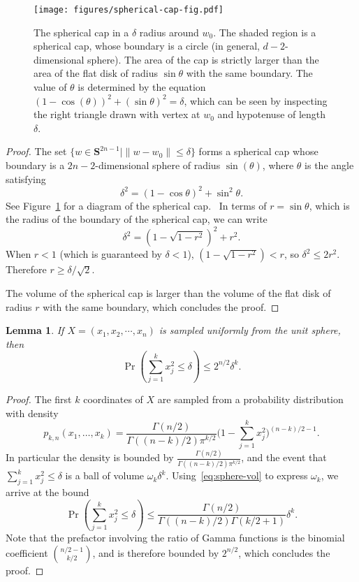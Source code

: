 \documentclass[11pt]{article}
\theoremstyle{plain}
\theoremstyle{plain}
\newtheorem{lem}{Lemma}
\theoremstyle{plain}
\theoremstyle{plain}
\theoremstyle{plain}
\theoremstyle{plain}
\theoremstyle{plain}
\theoremstyle{remark}
\theoremstyle{remark}
\theoremstyle{plain}
\theoremstyle{plain}
\theoremstyle{plain}
\theoremstyle{plain}
\newcommand{\Prob}{\Pr}
\newcommand{\Sphere}{{\mathbf S}}
\begin{document}
\begin{figure}
\centering
\texttt{[image: figures/spherical-cap-fig.pdf]} 
\caption{The spherical cap in a $\delta$ radius around $w_0$.  The shaded region is a spherical cap, whose boundary is a circle (in general, $d-2$-dimensional sphere).  The area of the cap is strictly larger than the area of the flat disk of radius $\sin\theta$ with the same boundary.  The value of $\theta$ is determined by the equation
$(1-\cos(\theta))^2 + (\sin\theta)^2 = \delta$, which can be seen by inspecting the right triangle drawn with vertex at $w_0$ and hypotenuse of length $\delta$.}
\label{fig:sphere-fig}
\end{figure}

\begin{proof}
The set $\{w\in\Sphere^{2n-1} \mid \|w-w_0\|\leq\delta\}$ forms a spherical cap whose boundary is a
$2n-2$-dimensional sphere of radius $\sin(\theta)$, where $\theta$ is the angle satisfying
\[
\delta^2 = (1-\cos\theta)^2 + \sin^2\theta.
\]
See Figure~\ref{fig:sphere-fig} for a diagram of the spherical cap.
\
In terms of $r=\sin\theta$, which is the radius of the boundary of the spherical cap, we can write
\[
\delta^2 = (1-\sqrt{1-r^2})^2 + r^2.
\]
When $r<1$ (which is guaranteed by $\delta < 1$),
$(1-\sqrt{1-r^2}) < r$, so $\delta^2 \leq 2r^2$.  Therefore $r \geq \delta / \sqrt{2}$.

The volume of the spherical cap is larger than the volume of the flat disk of radius $r$ with the same boundary,
which concludes the proof.
\end{proof}

\begin{lem}
\label{lem:small-coords}
If $X=(x_1,x_2,\cdots,x_n)$ is sampled uniformly from the unit sphere, then
\[
\Prob(\sum_{j=1}^k x_j^2 \leq \delta) \leq 2^{n/2} \delta^k.
\]
\end{lem}
\begin{proof}
The first $k$ coordinates of $X$ are sampled from a probability distribution with density
\[
p_{k,n}(x_1,\dots,x_k) = \frac{\Gamma(n/2)}{\Gamma((n-k)/2)\pi^{k/2}} \big(1 - \sum_{j=1}^k x_j^2\big)^{(n-k)/2-1}.
\]
In particular the density is bounded by $\frac{\Gamma(n/2)}{\Gamma((n-k)/2) \pi^{k/2}}$, and the event that
$\sum_{j=1}^k x_j^2 \leq \delta$ is a ball of volume $\omega_k \delta^k$.  Using~\eqref{eq:sphere-vol}
to express $\omega_k$, we arrive at the bound
\[
\Prob(\sum_{j=1}^k x_j^2 \leq \delta) \leq \frac{\Gamma(n/2)}{\Gamma((n-k)/2)\Gamma(k/2+1)} \delta^k.
\]
Note that the prefactor involving the ratio of Gamma functions is the binomial coefficient $\binom{n/2-1}{k/2}$,
and is therefore bounded by $2^{n/2}$, which concludes the proof.
\end{proof}
\end{document}
